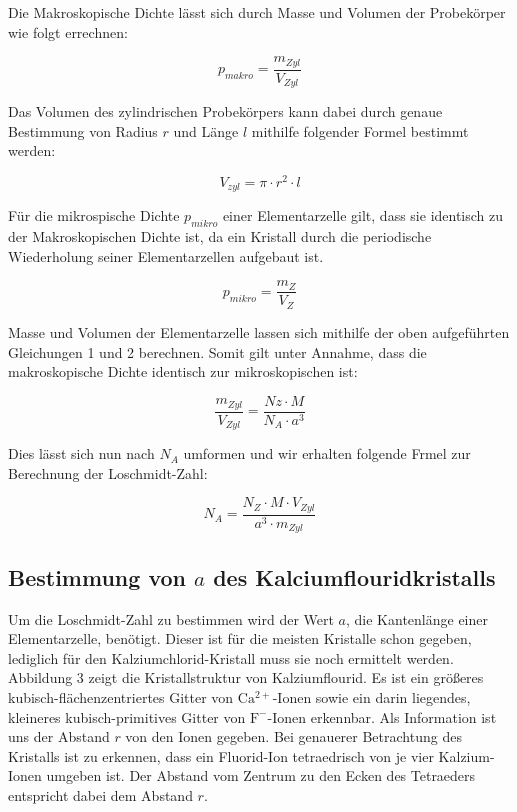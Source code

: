 \documentclass[12pt,a4paper,titlepage,headinclude,bibtotoc]{scrartcl}
\begin{document}
Die Makroskopische Dichte lässt sich durch  Masse und Volumen der Probekörper wie folgt errechnen:

\begin{equation}
p_{makro}= \frac{m_{Zyl}}{V_{Zyl}}
\end{equation}

Das Volumen des zylindrischen Probekörpers kann dabei durch genaue Bestimmung von Radius $r$ und Länge $l$ mithilfe folgender Formel bestimmt werden:

\begin{equation}
V_{zyl} = \pi \cdot r^{2} \cdot l
\end{equation}

Für die mikrospische Dichte $p_{mikro}$ einer Elementarzelle gilt, dass sie identisch zu der Makroskopischen Dichte ist, da ein Kristall durch die periodische Wiederholung seiner Elementarzellen aufgebaut ist.

\begin{equation}
p_{mikro}=\frac{m_Z}{V_Z}
\end{equation}

Masse und Volumen der Elementarzelle lassen sich mithilfe der oben aufgeführten Gleichungen 1 und 2 berechnen. Somit gilt unter Annahme, dass die makroskopische Dichte identisch zur mikroskopischen ist:

\begin{equation}
\frac{m_{Zyl}}{V_{Zyl}}= \frac{Nz \cdot M}{N_{A} \cdot a^3}
\end{equation}

Dies lässt sich nun nach $N_A$ umformen und wir erhalten folgende Frmel zur Berechnung der Loschmidt-Zahl:

\begin{equation}
N_A= \frac{N_Z \cdot M \cdot V_{Zyl}}{a^3 \cdot m_{Zyl}}
\end{equation}

\subsection{Bestimmung von $a$ des Kalciumflouridkristalls}
 
Um die Loschmidt-Zahl zu bestimmen wird der Wert $a$, die Kantenlänge einer Elementarzelle, benötigt. Dieser ist für die meisten Kristalle schon gegeben, lediglich für den Kalziumchlorid-Kristall muss sie noch ermittelt werden. Abbildung 3 zeigt die Kristallstruktur von Kalziumflourid. Es ist ein größeres kubisch-flächenzentriertes Gitter von $ \mathrm {Ca^{2+}}$-Ionen sowie ein darin liegendes, kleineres kubisch-primitives Gitter von $ \mathrm{F^-}$-Ionen erkennbar. Als Information ist uns der Abstand $r$ von den Ionen gegeben. Bei genauerer Betrachtung des Kristalls ist zu erkennen, dass ein Fluorid-Ion tetraedrisch von je vier Kalzium-Ionen umgeben ist. Der Abstand vom Zentrum zu den Ecken des Tetraeders entspricht dabei dem Abstand $r$.
\end{document}
